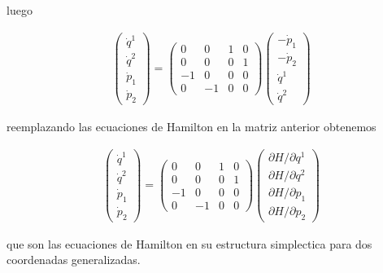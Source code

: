 \documentclass[12pt]{report}
\begin{document}
luego


\begin{eqnarray} 
\left( 
\begin{array}{c} \nonumber
\dot{q}^1    \\
\dot{q}^2    \\ 
\dot{p}_1 \\
\dot{p}_2
\end{array}
\right) 
=
\left( 
\begin{array}{cccc} \nonumber
0 & 0 & 1 & 0  \\
0 & 0 & 0 & 1  \\
-1 & 0 & 0 & 0 \\
0 & -1 & 0 & 0
\end{array}
\right)
\left( 
\begin{array}{c} \nonumber
-\dot{p}_1    \\
-\dot{p}_2    \\ 
\dot{q}^1 \\
\dot{q}^2
\end{array}
\right) 
\end{eqnarray}


reemplazando las ecuaciones de Hamilton en la matriz anterior obtenemos


\begin{eqnarray} 
\left( 
\begin{array}{c} \nonumber
\dot{q}^1    \\
\dot{q}^2    \\ 
\dot{p}_1 \\
\dot{p}_2
\end{array}
\right) 
=
\left( 
\begin{array}{cccc} \nonumber
0 & 0 & 1 & 0  \\
0 & 0 & 0 & 1  \\
-1 & 0 & 0 & 0 \\
0 & -1 & 0 & 0
\end{array}
\right)
\left( 
\begin{array}{c} \nonumber
\partial H / \partial q^1   \\
\partial H / \partial q^2     \\ 
\partial H / \partial p_1   \\
\partial H / \partial p_2  
\end{array}
\right) 
\end{eqnarray}



que son las ecuaciones de Hamilton en su estructura simplectica para dos coordenadas generalizadas.
\end{document}
